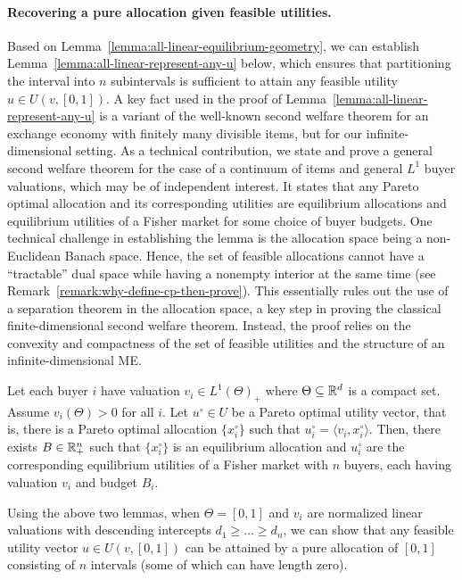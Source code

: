 \paragraph{Recovering a pure allocation given feasible utilities.} 
Based on Lemma~\ref{lemma:all-linear-equilibrium-geometry}, we can establish Lemma~\ref{lemma:all-linear-represent-any-u} below, which ensures that partitioning the interval into $n$ subintervals is sufficient to attain any feasible utility $u\in U(v, [0,1])$.
A key fact used in the proof of Lemma~\ref{lemma:all-linear-represent-any-u} is a variant of the well-known second welfare theorem for an exchange economy with finitely many divisible items, but for our infinite-dimensional setting.
As a technical contribution, we state and prove a general second welfare theorem for the case of a continuum of items and general $L^1$ buyer valuations, which may be of independent interest. 
It states that any Pareto optimal allocation and its corresponding utilities are equilibrium allocations and equilibrium utilities of a Fisher market for some choice of buyer budgets. One technical challenge in establishing the lemma is the allocation space being a non-Euclidean Banach space. Hence, the set of feasible allocations cannot have a ``tractable'' dual space while having a nonempty interior at the same time (see Remark~\ref{remark:why-define-cp-then-prove}). 
This essentially rules out the use of a separation theorem in the allocation space, a key step in proving the classical finite-dimensional second welfare theorem. 
Instead, the proof relies on the convexity and compactness of the set of feasible utilities and the structure of an infinite-dimensional ME.
\begin{lemma} 
	\label{lemma:pareto-opt-utility-is-equil-of-some-B}
	Let each buyer $i$ have valuation $v_i \in L^1(\Theta)_+$ where $\Theta\subseteq \mathbb{R}^d$ is a compact set. 
	Assume $v_i(\Theta)>0$ for all $i$.
	Let $u^\circ\in U$ be a Pareto optimal utility vector, that is, there is a Pareto optimal allocation $\{x^\circ_i\}$ such that $u^\circ_i = \langle v_i, x^\circ_i\rangle$. 
	Then, there exists $B \in \mathbb{R}^n_+$ such that $\{x^\circ_i\}$ is an equilibrium allocation and $u^\circ_i$ are the corresponding equilibrium utilities of a Fisher market with $n$ buyers, each having valuation $v_i$ and budget $B_i$.
\end{lemma}
Using the above two lemmas, when $\Theta = [0,1]$ and $v_i$ are normalized linear valuations with descending intercepts $d_1\geq \dots \geq d_n$, we can show that any feasible utility vector $u\in U(v, [0,1])$ can be attained by a pure allocation of $[0,1]$ consisting of $n$ intervals (some of which can have length zero).
